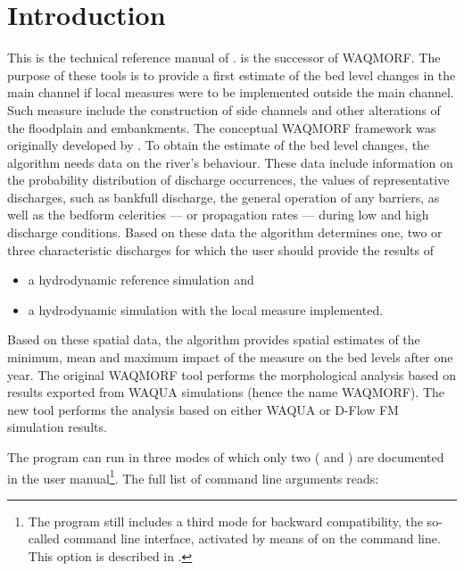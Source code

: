 \chapter{Introduction}

This is the technical reference manual of \dfastmi.
\dfastmi is the successor of WAQMORF.
The purpose of these tools is to provide a first estimate of the bed level changes in the main channel if local measures were to be implemented outside the main channel.
Such measure include the construction of side channels and other alterations of the floodplain and embankments.
The conceptual WAQMORF framework was originally developed by \citep{Sieben2008}.
To obtain the estimate of the bed level changes, the algorithm needs data on the river's behaviour.
These data include information on the probability distribution of discharge occurrences, the values of representative discharges, such as bankfull discharge, the general operation of any barriers, as well as the bedform celerities --- or propagation rates --- during low and high discharge conditions.
Based on these data the algorithm determines one, two or three characteristic discharges for which the user should provide the results of

\begin{itemize}
\item a hydrodynamic reference simulation and
\item a hydrodynamic simulation with the local measure implemented.
\end{itemize}

Based on these spatial data, the algorithm provides spatial estimates of the minimum, mean and maximum impact of the measure on the bed levels after one year.
The original WAQMORF tool performs the morphological analysis based on results exported from WAQUA simulations (hence the name WAQMORF).
The new \dfastmi tool performs the analysis based on either WAQUA or D-Flow FM simulation results.

The program can run in three modes of which only two ( and ) are documented in the user manual\footnote{\label{fn:backward1}The program still includes a third mode for backward compatibility, the so-called command line interface, activated by means of  on the command line.
This option is described in .}.
The full list of command line arguments reads:

